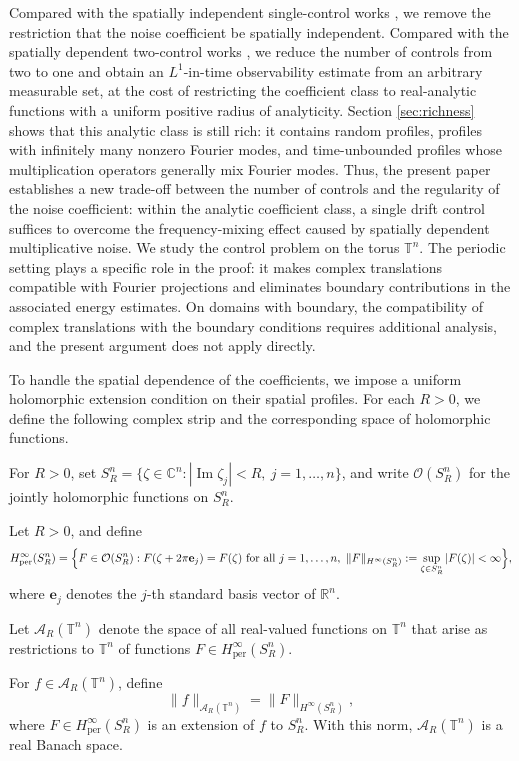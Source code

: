 \documentclass[print,wide]{draft}
\begin{document}
Compared with the spatially independent single-control works \cite{Lu2011,Yang2016a,Liu2026}, we remove the restriction that the noise coefficient be spatially independent. Compared with the spatially dependent two-control works \cite{HernandezSantamaria2023,Liu2014,ZhangXuLiu2026,Tang2009}, we reduce the number of controls from two to one and obtain an \(L^1\)-in-time observability estimate from an arbitrary measurable set, at the cost of restricting the coefficient class to real-analytic functions with a uniform positive radius of analyticity. Section \ref{sec:richness} shows that this analytic class is still rich: it contains random profiles, profiles with infinitely many nonzero Fourier modes, and time-unbounded profiles whose multiplication operators generally mix Fourier modes. Thus, the present paper establishes a new trade-off between the number of controls and the regularity of the noise coefficient: within the analytic coefficient class, a single drift control suffices to overcome the frequency-mixing effect caused by spatially dependent multiplicative noise. We study the control problem on the torus \(\mathbb{T}^n\). The periodic setting plays a specific role in the proof: it makes complex translations compatible with Fourier projections and eliminates boundary contributions in the associated energy estimates. On domains with boundary, the compatibility of complex translations with the boundary conditions requires additional analysis, and the present argument does not apply directly. 

To handle the spatial dependence of the coefficients, we impose a uniform holomorphic extension condition on their spatial profiles. For each $R > 0$, we define the following complex strip and the corresponding space of holomorphic functions. 

 



For $R>0$, set
$S_R^n=\{\zeta\in\mathbb{C}^n:|\operatorname{Im}\zeta_j|<R,\ j=1,\ldots,n\}$,
and write $\mathcal O(S_R^n)$ for the jointly holomorphic functions on $S_R^n$.
%
\begin{definition}\label{def:analytic-space}
Let \(R>0\), and define
\[
H^\infty_{\mathrm{per}}(S_R^n)
=\Bigl\{F\in\mathcal O(S_R^n):
F(\zeta+2\pi\mathbf e_j)=F(\zeta)\ \text{for all } j=1,\dots,n,\ 
\|F\|_{H^\infty(S_R^n)}:=\sup_{\zeta\in S_R^n}|F(\zeta)|<\infty\Bigr\},
\]
where \(\mathbf e_j\) denotes the \(j\)-th standard basis vector of \(\mathbb R^n\).

Let \(\mathcal A_R(\mathbb T^n)\) denote the space of all real-valued functions on \(\mathbb T^n\) that arise as restrictions to \(\mathbb T^n\) of functions \(F\in H^\infty_{\mathrm{per}}(S_R^n)\).
\end{definition}
%
For \(f\in\mathcal A_R(\mathbb T^n)\), define
\begin{equation}\label{eq:analytic-space-norm}
\|f\|_{\mathcal A_R(\mathbb T^n)}
=\|F\|_{H^\infty(S_R^n)},
\end{equation}
where \(F\in H^\infty_{\mathrm{per}}(S_R^n)\) is an extension of \(f\) to \(S_R^n\). With this norm, \(\mathcal A_R(\mathbb T^n)\) is a real Banach space.
\end{document}

